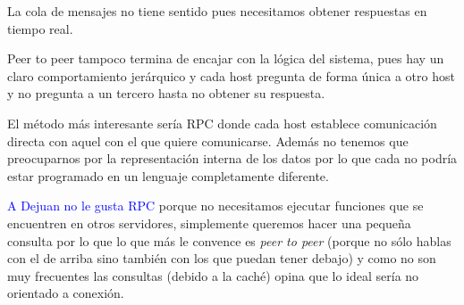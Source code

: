 \begin{problem}[12]
\spart

La cola de mensajes no tiene sentido pues necesitamos obtener respuestas en tiempo real.

Peer to peer tampoco termina de encajar con la lógica del sistema, pues hay un claro comportamiento jerárquico y cada host pregunta de forma única a otro host y no pregunta a un tercero hasta no obtener su respuesta.

El método más interesante sería RPC donde cada host establece comunicación directa con aquel con el que quiere comunicarse. Además no tenemos que preocuparnos por la representación interna de los datos por lo que cada no podría estar programado en un lenguaje completamente diferente.

\textcolor{blue}{A Dejuan no le gusta RPC} porque no necesitamos ejecutar funciones que se encuentren en otros servidores, simplemente queremos hacer una pequeña consulta por lo que lo que más le convence es \textit{peer to peer} (porque no sólo hablas con el de arriba sino también con los que puedan tener debajo) y como no son muy frecuentes las consultas (debido a la caché) opina que lo ideal sería no orientado a conexión.

\end{problem}


